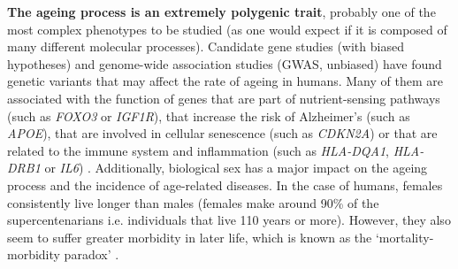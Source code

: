 \textbf{The ageing process is an extremely polygenic trait}, probably one of the most complex phenotypes to be studied (as one would expect if it is composed of many different molecular processes). Candidate gene studies (with biased hypotheses) and genome-wide association studies (\acrshort{GWAS}, unbiased) have found genetic variants that may affect the rate of ageing in humans. Many of them are associated with the function of genes that are part of nutrient-sensing pathways (such as \textit{FOXO3} or \textit{IGF1R}), that increase the risk of Alzheimer's (such as \textit{APOE}), that are involved in cellular senescence (such as \textit{CDKN2A}) or that are related to the immune system and inflammation (such as \textit{HLA-DQA1}, \textit{HLA-DRB1} or \textit{IL6}) \cite{Singh2019,Partridge2018}. Additionally, biological sex has a major impact on the ageing process and the incidence of age-related diseases. In the case of humans, females consistently live longer than males (females make around 90\% of the supercentenarians i.e. individuals that live 110 years or more). However, they also seem to suffer greater morbidity in later life, which is known as the `mortality-morbidity paradox' \cite{Austad2016}.

\bigskip


